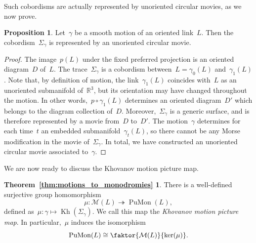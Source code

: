 \documentclass{amsart}
\theoremstyle{definition}
\theoremstyle{definition}
\theoremstyle{definition}
\theoremstyle{definition}
\newtheorem{proposition}[theorem]{Proposition}
\newtheorem*{thm:motions_to_monodromies}{Theorem~\ref{thm:motions_to_monodromies}}
\newcommand{\R}{\mathbb{R}}
\newcommand{\calM}{\mathcal{M}}
\DeclareMathOperator{\PuMon}{PuMon}
\DeclareMathOperator{\Kh}{Kh}
\begin{document}
Such cobordisms are actually represented by unoriented circular movies, as we now prove.

\begin{proposition}\label{prop:motions_to_circular_movies}
    Let~$\gamma$ be a smooth motion of an oriented link~$L$. Then the cobordism~$\Sigma_{\gamma}$ is represented by an unoriented circular movie.
\end{proposition}

\begin{proof}
    The image~$p(L)$ under the fixed preferred projection is an oriented diagram~$D$ of~$L$.
    The trace~$\Sigma_\gamma$ is a cobordism between~$L = \gamma_0(L)$ and~$\gamma_1(L)$. Note that, by definition of motion, the link~$\gamma_1(L)$ coincides with~$L$ as an unoriented submanifold of~$\R^3$, but its orientation may have changed throughout the motion. In other words,~$p\circ\gamma_1(L)$ determines an oriented diagram~$D'$ which belongs to the diagram collection of~$D$. Moreover,~$\Sigma_\gamma$ is a generic surface, and is therefore represented by a movie from~$D$ to~$D'$. The motion~$\gamma$ determines for each time~$t$ an embedded submanifold~$\gamma_t(L)$, so there cannot be any Morse modification in the movie of~$\Sigma_\gamma$. In total, we have constructed an unoriented circular movie associated to~$\gamma$.
\end{proof}

We are now ready to discuss the Khovanov motion picture map.

\begin{thm:motions_to_monodromies}
    There is a well-defined surjective group homomorphism~$$\mu \colon \mathcal{M}(L) \twoheadrightarrow \PuMon(L),$$
    defined as~$\mu \colon \gamma \mapsto \Kh(\Sigma_{\gamma})$. We call this map the \emph{Khovanov motion picture map}.
    In particular,~$\mu$ induces the isomorphism~$$ \PuMon(L) \cong \faktor{\calM(L)}{\ker(\mu)}.$$
\end{thm:motions_to_monodromies}
\end{document}
